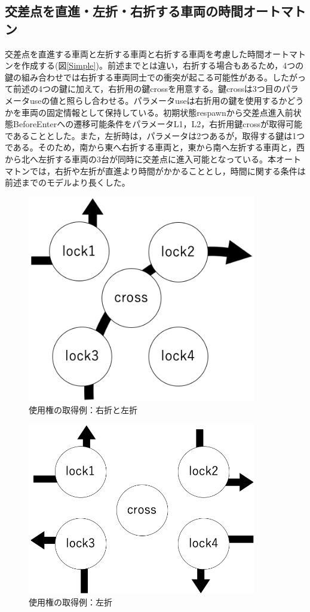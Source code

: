 \documentclass{tpu-sotu}
\begin{document}
	
	\subsection{交差点を直進・左折・右折する車両の時間オートマトン}
	交差点を直進する車両と左折する車両と右折する車両を考慮した時間オートマトンを作成する(図\ref{Simple})。前述までとは違い，右折する場合もあるため，4つの鍵の組み合わせでは右折する車両同士での衝突が起こる可能性がある。したがって前述の4つの鍵に加えて，右折用の鍵crossを用意する。鍵crossは3つ目のパラメータuseの値と照らし合わせる。パラメータuseは右折用の鍵を使用するかどうかを車両の固定情報として保持している。初期状態respawnから交差点進入前状態BeforeEnterへの遷移可能条件をパラメータL1，L2，右折用鍵crossが取得可能であることとした。また，左折時は，パラメータは2つあるが，取得する鍵は1つである。そのため，南から東へ右折する車両と，東から南へ左折する車両と，西から北へ左折する車両の3台が同時に交差点に進入可能となっている。本オートマトンでは，右折や左折が直進より時間がかかることとし，時間に関する条件は前述までのモデルより長くした。
	\begin{figure}[htbp]
	\centering
	\includegraphics[width=100mm]{wn-se.png}
	\caption{使用権の取得例：右折と左折}
	\label{RL}
	\end{figure}
	\begin{figure}[htbp]
	\centering
	\includegraphics[width=100mm]{leftcouse.png}
	\caption{使用権の取得例：左折}
	\label{4L}
	\end{figure}
\end{document}

